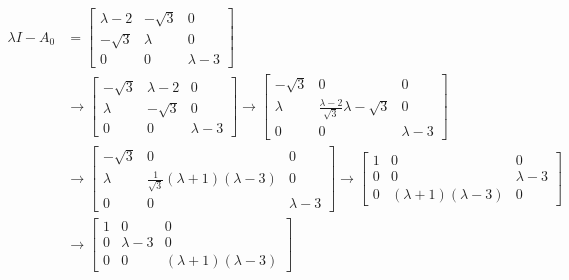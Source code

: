 \documentclass[12pt, a4paper, oneside, fontset=none]{ctexart}
\begin{document}
\begin{align*}
    \lambda I - A_0 & = \begin{bmatrix}
                            \lambda - 2 & -\sqrt{3} & 0           \\
                            -\sqrt{3}   & \lambda   & 0           \\
                            0           & 0         & \lambda - 3
                        \end{bmatrix}                                                 \\
                    & \to \begin{bmatrix}
                              -\sqrt{3} & \lambda - 2 & 0           \\
                              \lambda   & -\sqrt{3}   & 0           \\
                              0         & 0           & \lambda - 3
                          \end{bmatrix}
    \to \begin{bmatrix}
            -\sqrt{3} & 0                                          & 0           \\
            \lambda   & \frac{\lambda-2}{\sqrt{3}}\lambda-\sqrt{3} & 0           \\
            0         & 0                                          & \lambda - 3
        \end{bmatrix}                    \\
                    & \to \begin{bmatrix}
                              -\sqrt{3} & 0                                           & 0           \\
                              \lambda   & \frac{1}{\sqrt{3}}(\lambda + 1)(\lambda -3) & 0           \\
                              0         & 0                                           & \lambda - 3
                          \end{bmatrix}
    \to \begin{bmatrix}
            1 & 0                          & 0           \\
            0 & 0                          & \lambda - 3 \\
            0 & (\lambda + 1)(\lambda - 3) & 0
        \end{bmatrix}                                                          \\
                    & \to \begin{bmatrix}
                              1 & 0           & 0                          \\
                              0 & \lambda - 3 & 0                          \\
                              0 & 0           & (\lambda + 1)(\lambda - 3)
                          \end{bmatrix}
\end{align*}
\end{document}
